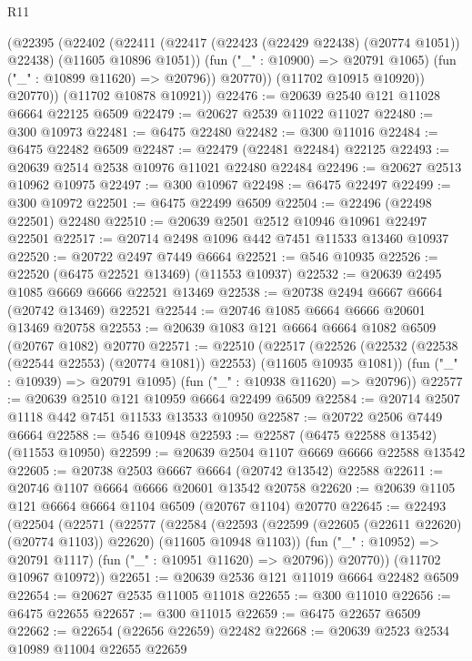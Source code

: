 \begin{lexlean}{R11}
\begin{coremodule}
              (@22395
                (@22402
                  (@22411
                    (@22417 (@22423 (@22429 @22438) (@20774 @1051)) @22438)
                    (@11605 @10896 @1051))
                  (fun ("_" : @10900) => @20791 @1065)
                  (fun ("_" : @10899 @11620) => @20796))
                @20770))
            (@11702 @10915 @10920))
          @20770))
      (@11702 @10878 @10921))
@22476 := @20639 @2540 @121 @11028 @6664 @22125 @6509
@22479 := @20627 @2539 @11022 @11027
@22480 := @300 @10973
@22481 := @6475 @22480
@22482 := @300 @11016
@22484 := @6475 @22482 @6509
@22487 := @22479 (@22481 @22484) @22125
@22493 := @20639 @2514 @2538 @10976 @11021 @22480 @22484
@22496 := @20627 @2513 @10962 @10975
@22497 := @300 @10967
@22498 := @6475 @22497
@22499 := @300 @10972
@22501 := @6475 @22499 @6509
@22504 := @22496 (@22498 @22501) @22480
@22510 := @20639 @2501 @2512 @10946 @10961 @22497 @22501
@22517 := @20714 @2498 @1096 @442 @7451 @11533 @13460 @10937
@22520 := @20722 @2497 @7449 @6664
@22521 := @546 @10935
@22526 := @22520 (@6475 @22521 @13469) (@11553 @10937)
@22532 := @20639 @2495 @1085 @6669 @6666 @22521 @13469
@22538 := @20738 @2494 @6667 @6664 (@20742 @13469) @22521
@22544 := @20746 @1085 @6664 @6666 @20601 @13469 @20758
@22553 := @20639 @1083 @121 @6664 @6664 @1082 @6509 (@20767 @1082) @20770
@22571 := @22510
    (@22517
      (@22526 (@22532 (@22538 (@22544 @22553) (@20774 @1081)) @22553) (@11605 @10935 @1081))
      (fun ("_" : @10939) => @20791 @1095)
      (fun ("_" : @10938 @11620) => @20796))
@22577 := @20639 @2510 @121 @10959 @6664 @22499 @6509
@22584 := @20714 @2507 @1118 @442 @7451 @11533 @13533 @10950
@22587 := @20722 @2506 @7449 @6664
@22588 := @546 @10948
@22593 := @22587 (@6475 @22588 @13542) (@11553 @10950)
@22599 := @20639 @2504 @1107 @6669 @6666 @22588 @13542
@22605 := @20738 @2503 @6667 @6664 (@20742 @13542) @22588
@22611 := @20746 @1107 @6664 @6666 @20601 @13542 @20758
@22620 := @20639 @1105 @121 @6664 @6664 @1104 @6509 (@20767 @1104) @20770
@22645 := @22493
    (@22504
      (@22571
        (@22577
          (@22584
            (@22593 (@22599 (@22605 (@22611 @22620) (@20774 @1103)) @22620) (@11605 @10948 @1103))
            (fun ("_" : @10952) => @20791 @1117)
            (fun ("_" : @10951 @11620) => @20796))
          @20770))
      (@11702 @10967 @10972))
@22651 := @20639 @2536 @121 @11019 @6664 @22482 @6509
@22654 := @20627 @2535 @11005 @11018
@22655 := @300 @11010
@22656 := @6475 @22655
@22657 := @300 @11015
@22659 := @6475 @22657 @6509
@22662 := @22654 (@22656 @22659) @22482
@22668 := @20639 @2523 @2534 @10989 @11004 @22655 @22659

\end{coremodule}
\end{lexlean}
